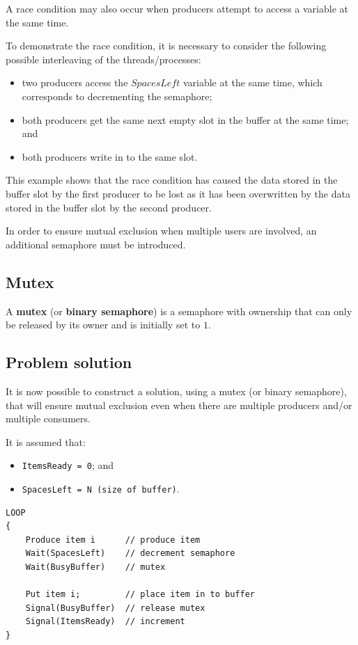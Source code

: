 \documentclass[a4paper]{systems-software}
\begin{document}
A race condition may also occur when producers attempt to access a variable at the same time.

To demonstrate the race condition, it is necessary to consider the following possible interleaving of the threads/processes:
\begin{itemize}
	\item two producers access the $SpacesLeft$ variable at the same time, which corresponds to decrementing the semaphore;
	\item both producers get the same next empty slot in the buffer at the same time; and
	\item both producers write in to the same slot.
\end{itemize}

This example shows that the race condition has caused the data stored in the buffer slot by the first producer to be lost as it has been overwritten by the data stored in the buffer slot by the second producer.

In order to ensure mutual exclusion when multiple users are involved, an additional semaphore must be introduced.


\subsection*{Mutex}

A \textbf{mutex} (or \textbf{binary semaphore}) is a semaphore with ownership that can only be released by its owner and is initially set to $1$.


\subsection*{Problem solution}

It is now possible to construct a solution, using a mutex (or binary semaphore), that will ensure mutual exclusion even when there are multiple producers and/or multiple consumers.

It is assumed that:
\begin{itemize}
	\item \texttt{ItemsReady = 0}; and
	\item \texttt{SpacesLeft = N (size of buffer)}.
\end{itemize}

\begin{lstlisting}[title={Producer class.}]
LOOP
{
	Produce item i      // produce item
	Wait(SpacesLeft)    // decrement semaphore
	Wait(BusyBuffer)    // mutex

	Put item i;         // place item in to buffer
	Signal(BusyBuffer)  // release mutex
	Signal(ItemsReady)  // increment
}
\end{lstlisting}
\end{document}
